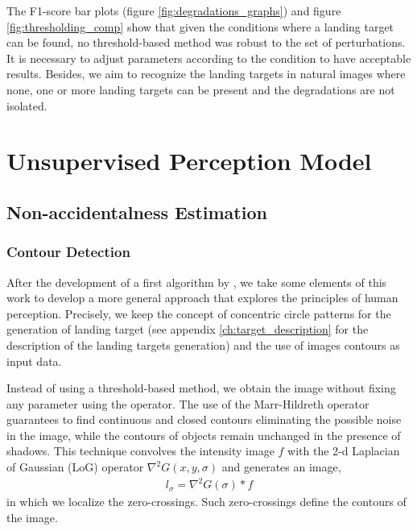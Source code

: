 The F1-score bar plots (figure \ref{fig:degradations_graphs}) and figure \ref{fig:thresholding_comp} show that given the conditions where a landing target can be found, no threshold-based method was robust to the set of perturbations. It is necessary to adjust parameters according to the condition to have acceptable results. Besides, we aim to recognize the landing targets in natural images where none, one or more landing targets can be present and the degradations are not isolated. 

\section{Unsupervised Perception Model}\label{sec:unsupervised_perception_model}
%
\subsection{Non-accidentalness Estimation}\label{subsec:Helmholtz}

\subsubsection{Contour Detection}\label{subsubsec:muiltiscale}

After the development of a first algorithm by \citep{BaquedanoA.:ESIEE:2017}, we take some elements of this work to develop a more general approach that explores the principles of human perception. Precisely, we keep the concept of concentric circle patterns for the generation of landing target (see appendix \ref{ch:target_description} for the description of the landing targets generation) and the use of images contours as input data.

Instead of using a threshold-based method, we obtain the image without fixing any parameter using the \cite{Marr.Hildreth:PRS:1980} operator. The use of the Marr-Hildreth operator guarantees to find continuous and closed contours eliminating the possible noise in the image, while the contours of objects remain unchanged in the presence of shadows. This technique convolves the intensity image $f$ with the 2-d Laplacian of Gaussian (LoG) operator $\nabla^{2} G(x, y,\sigma)$ and generates an image, 
\begin{eqnarray}\label{eq:LoG}
l_\sigma =  \nabla^{2} G(\sigma)\ast f
\end{eqnarray}
in which we localize the zero-crossings. Such zero-crossings define the contours of the image.

